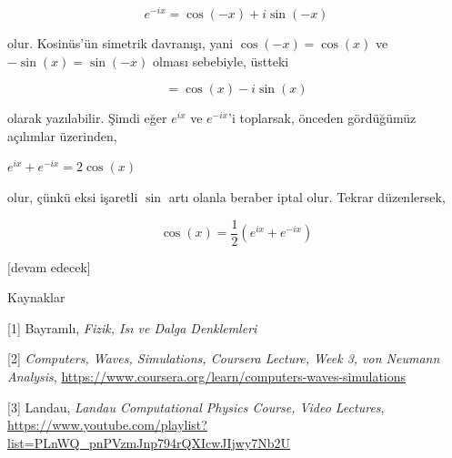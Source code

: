 \documentclass[12pt,fleqn]{article}\usepackage{../../common}
\begin{document}
$$
e^{-ix} = \cos (-x) + i\sin(-x)
$$

olur. Kosinüs'ün simetrik davranışı, yani $\cos(-x)=\cos(x)$ ve
$-\sin(x)=\sin(-x)$ olması sebebiyle, üstteki 

$$
= \cos(x) - i\sin(x)
$$

olarak yazılabilir. Şimdi eğer $e^{ix}$ ve $e^{-ix}$'i toplarsak, önceden
gördüğümüz açılımlar üzerinden,

$
e^{ix} + e^{-ix} = 2\cos(x)
$

olur, çünkü eksi işaretli $\sin$ artı olanla beraber iptal olur. Tekrar
düzenlersek,

$$
\cos(x) = \frac{1}{2} (e^{ix} + e^{-ix})
$$



[devam edecek]

Kaynaklar

[1] Bayramlı, {\em Fizik, Isı ve Dalga Denklemleri}

[2] {\em Computers, Waves, Simulations, Coursera Lecture, Week 3, von Neumann Analysis},
    \url{https://www.coursera.org/learn/computers-waves-simulations}

[3] Landau, {\em Landau Computational Physics Course, Video Lectures},
    \url{https://www.youtube.com/playlist?list=PLnWQ_pnPVzmJnp794rQXIcwJIjwy7Nb2U}
\end{document}
